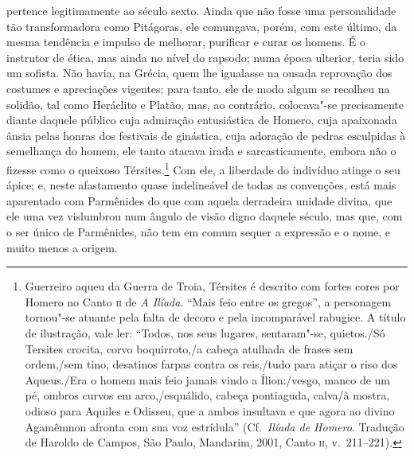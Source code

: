 pertence legitimamente ao século sexto. Ainda que não fosse uma
personalidade tão transformadora como Pitágoras, ele comungava, porém,
com este último, da mesma tendência e impulso de melhorar, purificar e
curar os homens. É o instrutor de ética, mas ainda no nível do rapsodo;
numa época ulterior, teria sido um sofista. Não havia, na Grécia, quem
lhe igualasse na ousada reprovação dos costumes e apreciações vigentes;
para tanto, ele de modo algum se recolheu na solidão, tal como
Heráclito e Platão, mas, ao contrário, colocava"-se precisamente diante
daquele público cuja admiração entusiástica de Homero, cuja apaixonada
ânsia pelas honras dos festivais de ginástica, cuja adoração de pedras
esculpidas à semelhança do homem, ele tanto atacava irada e
sarcasticamente, embora não o fizesse como o queixoso
Térsites.\footnote{ Guerreiro aqueu da Guerra de Troia, Térsites é
descrito com fortes cores por Homero no Canto \textsc{ii} de \textit{A Ilíada}.
``Mais feio entre os gregos'', a personagem tornou"-se atuante pela falta
de decoro e pela incomparável rabugice. A título de ilustração, vale ler: 
``Todos, nos seus lugares, sentaram"-se, quietos./Só Tersites crocita, corvo
boquirroto,/a cabeça atulhada de frases sem ordem,/sem tino, desatinos
farpas contra os reis,/tudo para atiçar o riso dos Aqueus./Era o homem mais feio 
jamais vindo a Ílion:/vesgo, manco de um pé, 
ombros curvos em arco,/esquálido, cabeça pontiaguda, calva/à mostra, 
odioso para Aquiles e Odisseu, que a ambos insultava e que agora
ao divino Agamêmnon afronta com sua voz estrídula'' (Cf.~\textit{Ilíada de Homero}. Tradução de
Haroldo de Campos, São Paulo, Mandarim, 2001, Canto \textsc{ii}, v.~211--221).}
Com ele, a liberdade do indivíduo atinge o seu ápice; e, neste afastamento quase
indelineável de todas as convenções, está mais aparentado com
Parmênides do que com aquela derradeira unidade divina, que ele uma vez
vislumbrou num ângulo de visão digno daquele século, mas que, com o ser
único de Parmênides, não tem em comum sequer a expressão e o nome, e
muito menos a origem.

